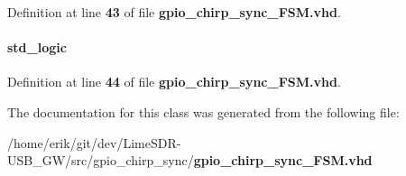 Definition at line {\bf 43} of file {\bf gpio\+\_\+chirp\+\_\+sync\+\_\+\+F\+S\+M.\+vhd}.

\paragraph[{u\+\_\+d\+\_\+sig}]{ {\bfseries \textcolor{comment}{std\+\_\+logic}\textcolor{vhdlchar}{ }} \hspace{0.3cm}{\ttfamily [Signal]}}\label{classgpio__chirp__sync__FSM_1_1arch_afe6e163cf2fa2001428f51ffb4f4c706}


Definition at line {\bf 44} of file {\bf gpio\+\_\+chirp\+\_\+sync\+\_\+\+F\+S\+M.\+vhd}.



The documentation for this class was generated from the following file\+:\begin{DoxyCompactItemize}
\item 
/home/erik/git/dev/\+Lime\+S\+D\+R-\/\+U\+S\+B\+\_\+\+G\+W/src/gpio\+\_\+chirp\+\_\+sync/{\bf gpio\+\_\+chirp\+\_\+sync\+\_\+\+F\+S\+M.\+vhd}\end{DoxyCompactItemize}
